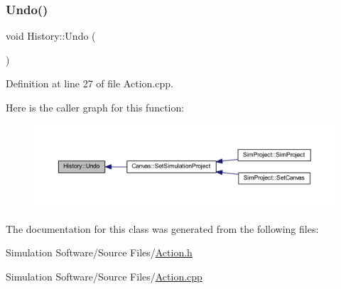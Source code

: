 \subsubsection{\texorpdfstring{Undo()}{Undo()}}
{\footnotesize\ttfamily void History\+::\+Undo (\begin{DoxyParamCaption}{ }\end{DoxyParamCaption})}



Definition at line 27 of file Action.\+cpp.

Here is the caller graph for this function\+:
\nopagebreak
\begin{figure}[H]
\begin{center}
\leavevmode
\includegraphics[width=350pt]{class_history_a4cf63a4e996f75e5c3b99b42fe56c6d3_icgraph}
\end{center}
\end{figure}


The documentation for this class was generated from the following files\+:\begin{DoxyCompactItemize}
\item 
Simulation Software/\+Source Files/\hyperlink{_action_8h}{Action.\+h}\item 
Simulation Software/\+Source Files/\hyperlink{_action_8cpp}{Action.\+cpp}\end{DoxyCompactItemize}
